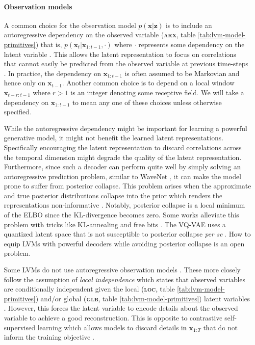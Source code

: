 {\paragraph{Observation models} 
A common choice for the observation model $p(\mathbf{x}|\mathbf{z})$ is to include an autoregressive dependency on the observed variable (\textbf{\textsc{arx}}, table \ref{tab:lvm-model-primitives}) that is, $p(\mathbf{x}_t|\mathbf{x}_{1:t-1}, \cdot)$ where $\cdot$ represents some dependency on the latent variable \cite{chung_recurrent_2015, fraccaro_sequential_2016, oord_neural_2018, oord_representation_2018}. This allows the latent representation to focus on correlations that cannot easily be predicted from the observed variable at previous time-steps \cite{oord_representation_2018}. In practice, the dependency on $\mathbf{x}_{1:t-1}$ is often assumed to be Markovian and hence only on $\mathbf{x}_{t-1}$. Another common choice is to depend on a local window $\mathbf{x}_{t-r:t-1}$ where $r>1$ is an integer denoting some receptive field. We will take a dependency on $\mathbf{x}_{1:t-1}$ to mean any one of these choices unless otherwise specified.

While the autoregressive dependency might be important for learning a powerful generative model, it might not benefit the learned latent representations. Specifically encouraging the latent representation to discard correlations across the temporal dimension might degrade the quality of the latent representation.
Furthermore, since such a decoder can perform quite well by simply solving an autoregressive prediction problem, similar to WaveNet \cite{oord_wavenet_2016}, it can make the model prone to suffer from posterior collapse. This problem arises when the approximate and true posterior distributions collapse into the prior which renders the representations non-informative \cite{bowman_generating_2016, sonderby_ladder_2016}. Notably, posterior collapse is a local minimum of the ELBO since the KL-divergence becomes zero. 
Some works alleviate this problem with tricks like KL-annealing and free bits \cite{bowman_generating_2016, sonderby_ladder_2016, kingma_improved_2016}. 
The VQ-VAE uses a quantized latent space that is not susceptible to posterior collapse \textit{per se} \cite{oord_neural_2018}. How to equip LVMs with powerful decoders while avoiding posterior collapse is an open problem.

Some LVMs do not use autoregressive observation models \cite{ebbers_hidden_2017, glarner_full_2018, hsu_unsupervised_2017, hsu_learning_2017, khurana_factorial_2019, khurana_convolutional_2020}. These more closely follow the assumption of \emph{local independence} which states that observed variables are conditionally independent given the local (\textbf{\textsc{loc}}, table \ref{tab:lvm-model-primitives}) and/or global (\textbf{\textsc{glb}}, table \ref{tab:lvm-model-primitives}) latent variables \cite{bartholomew_latent_2011}. 
However, this forces the latent variable to encode details about the observed variable to achieve a good reconstruction. This is opposite to contrastive self-supervised learning which allows models to discard details in $\mathbf{x}_{1:T}$ that do not inform the training objective \cite{baevski_wav2vec_2020}.



}

